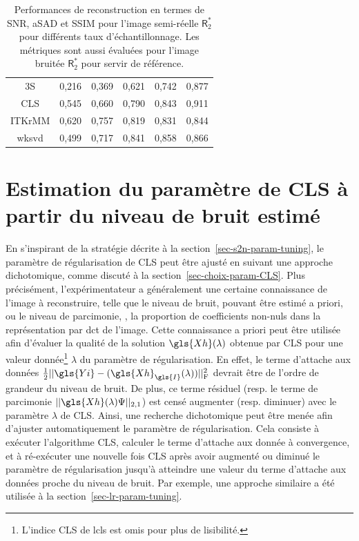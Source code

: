 \begin{table}[h!]
{\begin{tabular}{*{6}{c}}
            3S&0,216&0,369&0,621&0,742&0,877\\
            CLS&0,545&0,660&0,790&0,843&0,911\\
            ITKrMM&0,620&0,757&0,819&0,831&0,844\\
            \gls{wksvd}&0,499&0,717&0,841&0,858&0,866\\
            \bottomrule
        \end{tabular}
    }
    \caption{Performances de reconstruction en termes de SNR, aSAD et SSIM pour l'image semi-réelle $\mathsf{R}_2^*$ pour différents taux d'échantillonnage. Les métriques sont aussi évaluées pour l'image bruitée $\mathsf{R}_2^*$ pour servir de référence.
        \protect\label{table-higher-samp-ratio}}
\end{table}



%
\section{Estimation du paramètre de CLS à partir du niveau de bruit estimé}\label{sec-lcls-param-estim}

En s'inspirant de la stratégie décrite à la section~\ref{sec-s2n-param-tuning}, le paramètre de régularisation de CLS peut être ajusté en suivant une approche dichotomique, comme discuté à la section~\ref{sec-choix-param-CLS}. Plus précisément, l'expérimentateur a généralement une certaine connaissance de l'image à reconstruire, telle que le niveau de bruit, pouvant être estimé a priori, ou le niveau de parcimonie, \ie{}, la proportion de coefficients non-nuls dans la représentation par \gls{dct} de l'image. Cette connaissance a priori peut être utilisée afin d'évaluer la qualité de la solution $\gls{Xh}(\lambda)$ obtenue par CLS pour une valeur donnée\footnote{L'indice CLS de \gls{lcls} est omis pour plus de lisibilité.} $\lambda$ du paramètre de régularisation. En effet, le terme d'attache aux données $\frac{1}{2} \frobnorm{\gls{Yi} - (\gls{Xh}_{\gls{I}}(\lambda))}$ devrait être de l'ordre de grandeur du niveau de bruit. De plus, ce terme résiduel (resp. le terme de parcimonie $||\gls{Xh}(\lambda)\Psi||_{2, 1}$)  est censé augmenter (resp. diminuer) avec le paramètre $\lambda$ de CLS. Ainsi, une recherche dichotomique peut être menée afin d'ajuster automatiquement le paramètre de régularisation. Cela consiste à exécuter l'algorithme CLS, calculer le terme d'attache aux donnée à convergence, et à ré-exécuter une nouvelle fois CLS après avoir augmenté ou diminué le paramètre de régularisation jusqu'à atteindre une valeur du terme d'attache aux données proche du niveau de bruit. Par exemple, une approche similaire a été utilisée à la section~\ref{sec-lr-param-tuning}.

